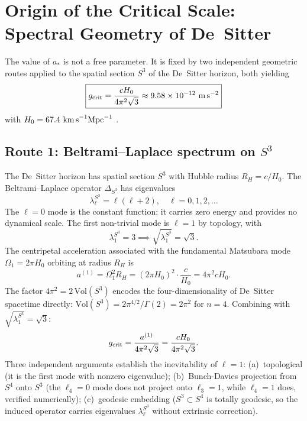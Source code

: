 \documentclass[11pt,a4paper]{article}
\begin{document}
\section{Origin of the Critical Scale: Spectral Geometry of De~Sitter}
\label{sec:gcrit}

The value of $a_*$ is not a free parameter. It is fixed by two independent geometric
routes applied to the spatial section $S^3$ of the De~Sitter horizon, both yielding
\begin{equation}
  \boxed{g_{\rm crit} = \frac{cH_0}{4\pi^2\sqrt{3}}\approx 9.58\times10^{-12}\ \text{m\,s}^{-2}}
  \label{eq:gcrit}
\end{equation}
with $H_0 = 67.4\ \text{km\,s}^{-1}\text{Mpc}^{-1}$ \cite{Planck2020}.

\subsection{Route 1: Beltrami--Laplace spectrum on \texorpdfstring{$S^3$}{S3}}
\label{subsec:BL}

The De~Sitter horizon has spatial section $S^3$ with Hubble radius $R_H = c/H_0$.
The Beltrami--Laplace operator $\Delta_{S^3}$ has eigenvalues
\begin{equation}
  \lambda_\ell^{S^3} = \ell(\ell+2), \quad \ell = 0,1,2,\ldots
\end{equation}
The $\ell = 0$ mode is the constant function: it carries zero energy and provides no
dynamical scale. The first non-trivial mode is $\ell = 1$ by topology, with
\begin{equation}
  \lambda_1^{S^3} = 3 \implies \sqrt{\lambda_1^{S^3}} = \sqrt{3}.
\end{equation}
The centripetal acceleration associated with the fundamental Matsubara mode
$\Omega_1 = 2\pi H_0$ orbiting at radius $R_H$ is
\begin{equation}
  a^{(1)} = \Omega_1^2 R_H = (2\pi H_0)^2 \cdot \frac{c}{H_0} = 4\pi^2 c H_0.
\end{equation}
The factor $4\pi^2 = 2\,\text{Vol}(S^3)$ encodes the four-dimensionality of De~Sitter
spacetime directly: $\text{Vol}(S^3) = 2\pi^{4/2}/\Gamma(2) = 2\pi^2$ for $n=4$.
Combining with $\sqrt{\lambda_1^{S^3}} = \sqrt{3}$:
\begin{equation}
  g_{\rm crit} = \frac{a^{(1)}}{4\pi^2\sqrt{3}} = \frac{cH_0}{4\pi^2\sqrt{3}}.
\end{equation}
Three independent arguments establish the inevitability of $\ell = 1$: (a)~topological
(it is the first mode with nonzero eigenvalue); (b)~Bunch-Davies projection from $S^4$
onto $S^3$ (the $\ell_4=0$ mode does not project onto $\ell_3=1$, while $\ell_4=1$
does, verified numerically); (c)~geodesic embedding ($S^3\subset S^4$ is totally
geodesic, so the induced operator carries eigenvalues $\lambda_\ell^{S^3}$ without
extrinsic correction).
\end{document}

